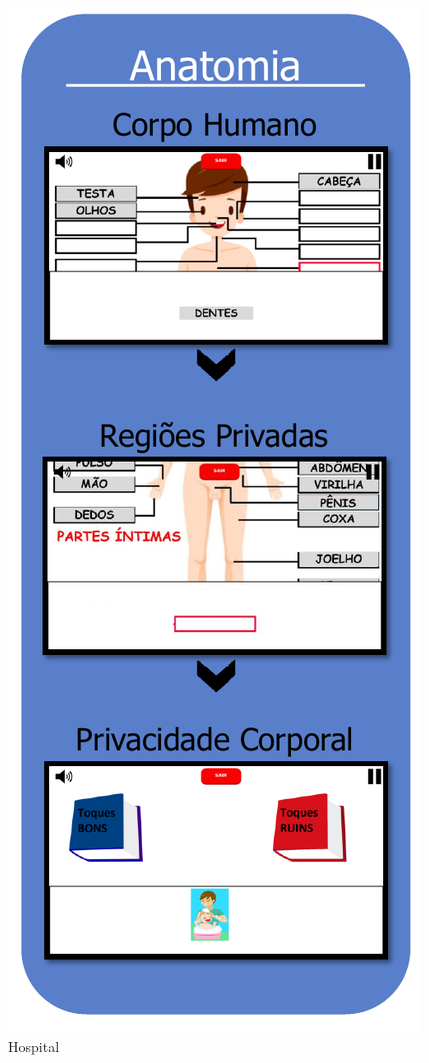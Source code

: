 \begin{figure}%
  \vspace{-20pt}
  \caption{\label{fig:Hospitalzinho}Hospital}
  \includegraphics[width=\linewidth]{./Figuras/Hospital.pdf}
  \vspace{-1.0cm}
\end{figure}

